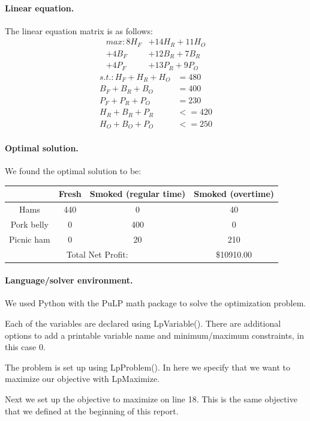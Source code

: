 \documentclass[11pt,letterpaper]{article}
\begin{document}
\paragraph{Linear equation.} The linear equation matrix is as follows: \\
\begin{align*}
max: 8 H_F &+ 14 H_R + 11 H_O \\
+ 4 B_F &+ 12 B_R + 7 B_R \\ 
+ 4 P_F &+ 13 P_R + 9 P_O
\end{align*}
\begin{align*}
s.t.: H_F + H_R + H_O &= 480 \\
B_F + B_R + B_O &= 400 \\
P_F + P_R + P_O &= 230 \\
H_R + B_R + P_R &<= 420 \\
H_O + B_O + P_O &<= 250
\end{align*}

\paragraph{Optimal solution.} We found the optimal solution to be: \\
\begin{tabular}{|c|c|c|c|}
\hline 
& Fresh & Smoked (regular time) & Smoked (overtime) \\ 
\hline 
Hams & 440 & 0 & 40 \\ 
Pork belly & 0 & 400 & 0 \\ 
Picnic ham & 0 & 20 & 210 \\ 
\hline 
\multicolumn{3}{|c}{Total Net Profit:} & $\$$10910.00 \\ 
\hline 
\end{tabular} 

\paragraph{Language/solver environment.} We used Python with the PuLP math package to solve the optimization problem.

Each of the variables are declared using LpVariable().  There are additional options to add a printable variable name and minimum/maximum constraints, in this case 0.

The problem is set up using LpProblem().  In here we specify that we want to maximize our objective with LpMaximize.

Next we set up the objective to maximize on line 18. This is the same objective that we defined at the beginning of this report. 
\end{document}
